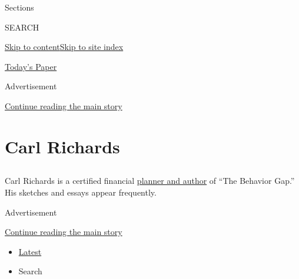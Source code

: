 Sections

SEARCH

\protect\hyperlink{site-content}{Skip to
content}\protect\hyperlink{site-index}{Skip to site index}

\href{https://myaccount.nytimes3xbfgragh.onion/auth/login?response_type=cookie\&client_id=vi}{}

\href{https://www.nytimes3xbfgragh.onion/section/todayspaper}{Today's
Paper}

Advertisement

\protect\hyperlink{after-top}{Continue reading the main story}

\hypertarget{carl-richards}{%
\section{Carl Richards}\label{carl-richards}}

\hypertarget{section}{%
\subsection{}\label{section}}

Carl Richards is a certified financial
\href{https://behaviorgap.com}{planner and author} of ``The Behavior
Gap.'' His sketches and essays appear frequently.~

Advertisement

\protect\hyperlink{after-mid1}{Continue reading the main story}

\begin{itemize}
\tightlist
\item
  \protect\hyperlink{stream-panel}{Latest}
\item
  Search
\end{itemize}

